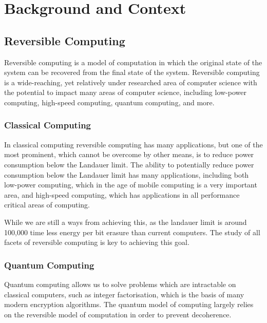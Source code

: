 \chapter*{Background and Context}

\section{Reversible Computing}\label{sec:reversible-computing}
Reversible computing is a model of computation in which the original state of the system can be recovered from the final state of the system\cite{bennett_logical_1973}.
Reversible computing is a wide-reaching, yet relatively under researched area of computer science with the potential to impact many areas of computer science, including low-power computing\cite{landauer_irreversibility_1961}, high-speed computing, quantum computing, and more.

\subsection{Classical Computing}\label{subsec:classical-computing}
In classical computing reversible computing has many applications, but one of the most prominent, which cannot be overcome by other means, is to reduce power consumption below the Landauer limit\cite{landauer_irreversibility_1961}.
The ability to potentially reduce power consumption below the Landauer limit has many applications, including both low-power computing, which in the age of mobile computing is a very important area, and high-speed computing, which has applications in all performance critical areas of computing.

While we are still a ways from achieving this, as the landauer limit is around 100,000 time less energy per bit erasure than current computers.
The study of all facets of reversible computing is key to achieving this goal.

\subsection{Quantum Computing}\label{subsec:quantum-computing}
Quantum computing allows us to solve problems which are intractable on classical computers, such as integer factorisation, which is the basis of many modern encryption algorithms.
The quantum model of computing largely relies on the reversible model of computation in order to prevent decoherence.

